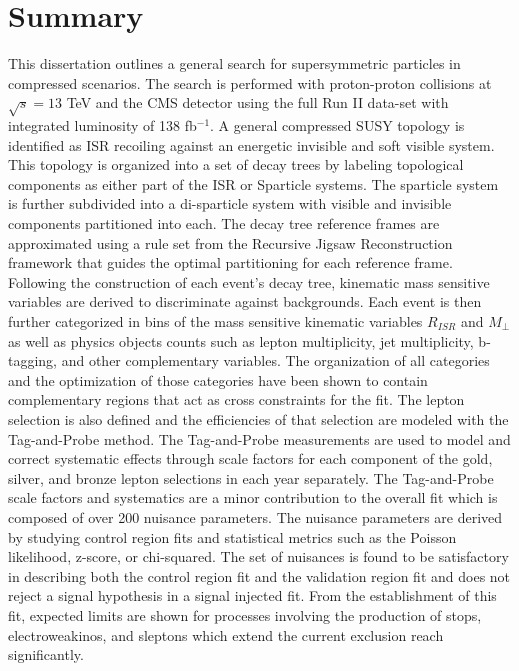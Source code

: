 \setcounter{secnumdepth}{3}
\setcounter{tocdepth}{3}
\setlength{\parskip}{\smallskipamount}
\setlength{\parindent}{0pt}


\makeatletter


\providecommand{\tabularnewline}{\\}


\makeatother


\chapter{Summary}


This dissertation outlines a general search for supersymmetric particles in compressed scenarios. The search is performed with proton-proton collisions at $\sqrt{s} = 13$ TeV and the CMS detector using the full Run II data-set with integrated luminosity of 138 fb$^{-1}$. A general compressed SUSY topology is identified as ISR recoiling against an energetic invisible and soft visible system. This topology is organized into a set of decay trees by labeling topological components as either part of the ISR or Sparticle systems. The sparticle system is further subdivided into a di-sparticle system with visible and invisible components partitioned into each. The decay tree reference frames are approximated using a rule set from the Recursive Jigsaw Reconstruction framework that guides the optimal partitioning for each reference frame. Following the construction of each event's decay tree, kinematic mass sensitive variables are derived to discriminate against backgrounds. Each event is then further categorized in bins of the mass sensitive kinematic variables $R_{ISR}$ and $M_\perp$ as well as physics objects counts such as lepton multiplicity, jet multiplicity, b-tagging, and other complementary variables. The organization of all categories and the optimization of those categories have been shown to contain complementary regions that act as cross constraints for the fit. The lepton selection is also defined and the efficiencies of that selection are modeled with the Tag-and-Probe method. The Tag-and-Probe measurements are used to  model and correct systematic effects through scale factors for each component of the gold, silver, and bronze lepton selections in each year separately. The Tag-and-Probe scale factors and systematics are a minor contribution to the overall fit which is composed of over 200 nuisance parameters. The nuisance parameters are derived by studying control region fits and statistical metrics such as the Poisson likelihood, z-score, or chi-squared. The set of nuisances is found to be satisfactory in describing both the control region fit and the validation region fit and does not reject a signal hypothesis in a signal injected fit. From the establishment of this fit, expected limits are shown for processes involving the production of stops, electroweakinos, and sleptons which extend the current exclusion reach significantly.   

